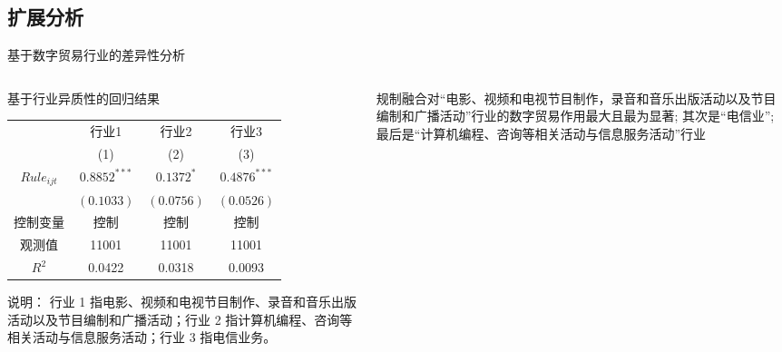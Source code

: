 \documentclass{beamer}
\newcommand{\zhhei}{\CJKfamily{zhhei}}  %
\begin{document}
\subsection{扩展分析}
\begin{frame}{基于数字贸易行业的差异性分析}
    \begin{columns}[T]
        \begin{column}{0.7\textwidth}
            \footnotesize
            \centering
            \begin{threeparttable}
                \captionsetup{font=footnotesize}
                \caption{基于行业异质性的回归结果}
                \begin{tabular}{cccc}
                    \toprule
                    & 行业1 & 行业2 & 行业3 \\
                    & (1) & (2) & (3) \\
                    \midrule
                    $Rule_{ijt}$ & $0.8852^{***}$ & $0.1372^{*}$ & $0.4876^{***}$ \\
                    & $(0.1033)$ & $(0.0756)$ & $(0.0526)$ \\
                    控制变量 & 控制 & 控制 & 控制 \\
                    观测值 & 11001 & 11001 & 11001 \\
                    $R^2$ & 0.0422 & 0.0318 & 0.0093 \\
                    \bottomrule
                \end{tabular}
                \begin{tablenotes}
                    \begin{footnotesize}
                        \item {\zhhei 说明：} 行业 1 指电影、视频和电视节目制作、录音和音乐出版活动以及节目编制和广播活动；行业 2 指计算机编程、咨询等相关活动与信息服务活动；行业 3 指电信业务。
                    \end{footnotesize}
                \end{tablenotes}
            \end{threeparttable}
        \end{column}
        \begin{column}{0.4\textwidth}
            \begin{tcolorbox}[colback=lightyellow,colframe=deepblue,coltext=black]
                \footnotesize
                规制融合对“电影、视频和电视节目制作，录音和音乐出版活动以及节目编制和广播活动”行业的数字贸易作用最大且最为显著; 其次是“电信业”; 最后是“计算机编程、咨询等相关活动与信息服务活动”行业
            \end{tcolorbox}
        \end{column}
    \end{columns}
\end{frame}
\end{document}
